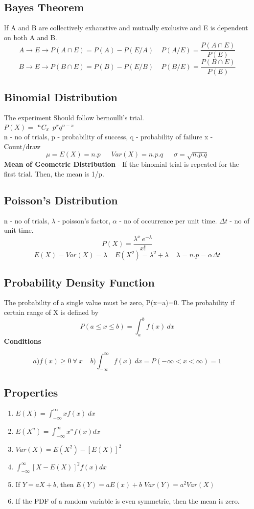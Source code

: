 \subsection*{Bayes Theorem}
If A and B are collectively exhaustive and mutually exclusive and E is dependent on both A and B.
\[A\rightarrow E\rightarrow P(A\cap E)=P(A)-P(E/A)\ \ \ \ \ P(A/E)=\frac{P(A\cap E)}{P(E)} \]
\[B\rightarrow E\rightarrow P(B\cap E)=P(B)-P(E/B)\ \ \ \ \ P(B/E)=\frac{P(B\cap E)}{P(E)}\]

\subsection{Binomial Distribution}
The experiment Should follow bernoulli's trial.\\
\(P(X)=\) ${}^{n}C_{x}$ \(p^xq^{n-x}\)\\
n - no of trials, p - probability of success, q - probability of failure x - Count/draw
\[\mu=E(X)=n.p\ \ \ \ \ \ \ Var(X)=n.p.q\ \ \ \ \ \ \ \sigma = \sqrt{n.p.q} \]
\textbf{Mean of Geometric Distribution} - If the binomial trial is repeated for the first trial. Then, the mean is 1/p.

\subsection{Poisson's Distribution}
n - no of trials, \(\lambda\) - poisson's factor, \(\alpha\) - no of occurrence per unit time.
\(\Delta t\) - no of unit time.
\[P(X)=\frac{\lambda^x\ e^{-\lambda}}{x!}\]
\[E(X) = Var(X) = \lambda\ \ \ \ \ E(X^2)=\lambda^2+\lambda\ \ \ \ \ \lambda=n.p=\alpha\Delta t\]

\subsection{Probability Density Function}
The probability of a single value must be zero, P(x=a)=0. The probability if certain range of X is defined by
\[P(a\leq x \leq b)=\int_a^bf(x)\ dx\]
\textbf{Conditions}\\
\begin{fleqn}
\[a) f(x)\geq0\ \forall\ x\ \ \ \ \ b) \int_{-\infty}^{\infty}f(x)\ dx=P(-\infty < x < \infty) = 1 \]
\end{fleqn}

\subsection*{Properties}
\begin{enumerate}
    \item \(E(X) = \int_{-\infty}^{\infty}xf(x)\ dx\)
    \item \(E(X^n)=\int_{-\infty}^{\infty}x^nf(x)dx\)
    \item \(Var(X)=E(X^2)-[E(X)]^2\)
    \item \(\int_{-\infty}^{\infty}[X-E(X)]^2f(x)dx\)
    \item If \(Y=aX+b\), then \(E(Y)=aE(x)+b\) \(Var(Y)=a^2Var(X)\)
    \item If the PDF of a random variable is even symmetric, then the mean is zero.
\end{enumerate}

